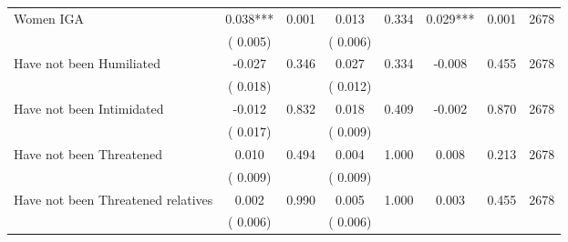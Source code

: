 \begin{tabular}{l*{7}{c}}
 Women IGA       &              0.038***       &        0.001  &              0.013       &        0.334  &              0.029***       &              0.001 &  2678 \\ 
                       &       (       0.005)             &                               &       (       0.006)                     &                               &                                               &                                &                      \\ 

 Have not been Humiliated       &             -0.027       &        0.346  &              0.027       &        0.334  &             -0.008       &              0.455 &  2678 \\ 
                       &       (       0.018)             &                               &       (       0.012)                     &                               &                                               &                                &                      \\ 

 Have not been Intimidated       &             -0.012       &        0.832  &              0.018       &        0.409  &             -0.002       &              0.870 &  2678 \\ 
                       &       (       0.017)             &                               &       (       0.009)                     &                               &                                               &                                &                      \\ 

 Have not been Threatened       &              0.010       &        0.494  &              0.004       &        1.000  &              0.008       &              0.213 &  2678 \\ 
                       &       (       0.009)             &                               &       (       0.009)                     &                               &                                               &                                &                      \\ 

 Have not been Threatened relatives       &              0.002       &        0.990  &              0.005       &        1.000  &              0.003       &              0.455 &  2678 \\ 
                       &       (       0.006)             &                               &       (       0.006)                     &                               &                                               &                                &                      \\ 


\end{tabular}

